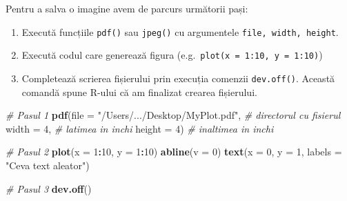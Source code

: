 \documentclass[]{article}
\newenvironment{Shaded}{\begin{snugshade}}{\end{snugshade}}
\newcommand{\CommentTok}[1]{\textcolor[rgb]{0.56,0.35,0.01}{\textit{#1}}}
\newcommand{\DataTypeTok}[1]{\textcolor[rgb]{0.13,0.29,0.53}{#1}}
\newcommand{\DecValTok}[1]{\textcolor[rgb]{0.00,0.00,0.81}{#1}}
\newcommand{\KeywordTok}[1]{\textcolor[rgb]{0.13,0.29,0.53}{\textbf{#1}}}
\newcommand{\NormalTok}[1]{#1}
\newcommand{\OperatorTok}[1]{\textcolor[rgb]{0.81,0.36,0.00}{\textbf{#1}}}
\newcommand{\StringTok}[1]{\textcolor[rgb]{0.31,0.60,0.02}{#1}}
\providecommand{\tightlist}{%
  \setlength{\itemsep}{0pt}\setlength{\parskip}{0pt}}
\renewcommand\refname{Referințe}
\begin{document}
Pentru a salva o imagine avem de parcurs următorii pași:

\begin{enumerate}
\def\labelenumi{\arabic{enumi}.}
\tightlist
\item
  Execută funcțiile \texttt{pdf()} sau \texttt{jpeg()} cu argumentele
  \texttt{file,\ width,\ height}.
\item
  Execută codul care generează figura
  (e.g.~\texttt{plot(x\ =\ 1:10,\ y\ =\ 1:10)})
\item
  Completează scrierea fișierului prin execuția comenzii
  \texttt{dev.off()}. Această comandă spune R-ului că am finalizat
  crearea fișierului.
\end{enumerate}

\begin{Shaded}
\begin{Highlighting}[]
\CommentTok{# Pasul 1}
\KeywordTok{pdf}\NormalTok{(}\DataTypeTok{file =} \StringTok{"/Users/.../Desktop/MyPlot.pdf"}\NormalTok{,   }\CommentTok{# directorul cu fisierul }
    \DataTypeTok{width =} \DecValTok{4}\NormalTok{, }\CommentTok{# latimea in inchi}
    \DataTypeTok{height =} \DecValTok{4}\NormalTok{) }\CommentTok{# inaltimea in inchi}

\CommentTok{# Pasul 2}
\KeywordTok{plot}\NormalTok{(}\DataTypeTok{x =} \DecValTok{1}\OperatorTok{:}\DecValTok{10}\NormalTok{, }
     \DataTypeTok{y =} \DecValTok{1}\OperatorTok{:}\DecValTok{10}\NormalTok{)}
\KeywordTok{abline}\NormalTok{(}\DataTypeTok{v =} \DecValTok{0}\NormalTok{) }
\KeywordTok{text}\NormalTok{(}\DataTypeTok{x =} \DecValTok{0}\NormalTok{, }\DataTypeTok{y =} \DecValTok{1}\NormalTok{, }\DataTypeTok{labels =} \StringTok{"Ceva text aleator"}\NormalTok{)}

\CommentTok{# Pasul 3}
\KeywordTok{dev.off}\NormalTok{()}
\end{Highlighting}
\end{Shaded}

\renewcommand\refname{Referințe}

\end{document}
